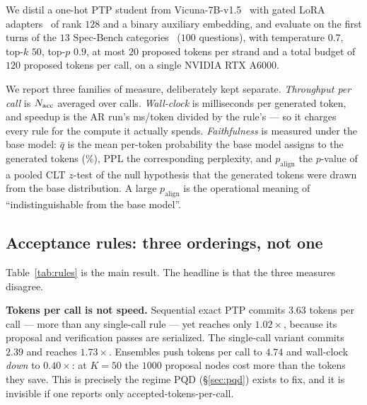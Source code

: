 \documentclass{article} %
\makeatletter
\newenvironment{ai}
  {\color{lightgray}%
   \@ifpackageloaded{caption}{\captionsetup{font={color=lightgray}}}{}%
   \let\ai@savedfloatreset\@floatboxreset
   \g@addto@macro\@floatboxreset{\color{lightgray}}}
  {\global\let\@floatboxreset\ai@savedfloatreset}
\makeatother
\begin{document}
\begin{ai}
We distil a one-hot PTP student from Vicuna-7B-v1.5~\citep{zheng2023vicuna} with
gated LoRA adapters~\citep{hu2022lora} of rank $128$ and a binary auxiliary
embedding, and evaluate on the first turns of the $13$ Spec-Bench
categories~\citep{xia2024specbench} ($100$ questions), with temperature $0.7$,
top-$k$ $50$, top-$p$ $0.9$, at most $20$ proposed tokens per strand and a total
budget of $120$ proposed tokens per call, on a single NVIDIA RTX A6000.

We report three families of measure, deliberately kept separate.
\emph{Throughput per call} is $N_{\mathrm{acc}}$ averaged over calls.
\emph{Wall-clock} is milliseconds per generated token, and speedup is the AR
run's ms/token divided by the rule's --- so it charges every rule for the compute
it actually spends. \emph{Faithfulness} is measured under the base model:
$\bar q$ is the mean per-token probability the base model assigns to the
generated tokens ($\%$), PPL the corresponding perplexity, and
$p_{\mathrm{align}}$ the $p$-value of a pooled CLT $z$-test of the null
hypothesis that the generated tokens were drawn from the base distribution. A
large $p_{\mathrm{align}}$ is the operational meaning of ``indistinguishable from
the base model''.

\subsection{Acceptance rules: three orderings, not one}
\label{sec:exp:rules}

Table~\ref{tab:rules} is the main result. The headline is that the three measures
disagree.

\begin{table}[t]
  \centering
  \caption{Acceptance rules on Spec-Bench. $\bar q$ is the mean per-token
  probability under the base model, $p_{\mathrm{align}}$ the $p$-value for
  ``generated tokens came from the base distribution''. $^\dagger$
  distribution-preserving by construction. Numbers are preliminary: single-seed
  runs on $100$ Spec-Bench first turns.}
  \label{tab:rules}
  \small
  
\end{table}

\textbf{Tokens per call is not speed.} Sequential exact PTP commits $3.63$ tokens
per call --- more than any single-call rule --- yet reaches only $1.02\times$,
because its proposal and verification passes are serialized. The single-call
variant commits $2.39$ and reaches $1.73\times$. Ensembles push tokens per call
to $4.74$ and wall-clock \emph{down} to $0.40\times$: at $K = 50$ the $1000$
proposal nodes cost more than the tokens they save. This is precisely the regime
PQD (\S\ref{sec:pqd}) exists to fix, and it is invisible if one reports only
accepted-tokens-per-call.


\end{ai}
\end{document}
